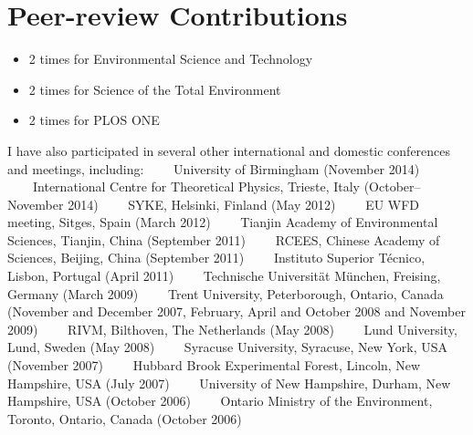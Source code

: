 
\section*{Peer-review Contributions}

\begin{footnotesize}

\begin{itemize}
  \itemsep-0.1em
\item 2 times for Environmental Science and Technology 
\item 2 times for Science of the Total Environment 
\item 2 times for PLOS ONE 
\end{itemize}


\flushleft I have also participated in several other international and domestic
conferences and meetings, including: 
\ \ \textbullet \ \  
University of Birmingham (November 2014)
\ \ \textbullet \ \  
International Centre for Theoretical Physics, Trieste, Italy
(October--November 2014)
\ \ \textbullet \ \  
SYKE, Helsinki, Finland (May 2012)
\ \ \textbullet \ \  
EU WFD meeting, Sitges, Spain (March 2012)
\ \ \textbullet \ \   
Tianjin Academy of Environmental Sciences, Tianjin, China (September 2011)
\ \ \textbullet \ \   
RCEES, Chinese Academy of Sciences, Beijing, China (September 2011)
\ \ \textbullet \ \   
Instituto Superior Técnico, Lisbon, Portugal (April 2011)
\ \ \textbullet \ \   
Technische Universität München, Freising, Germany (March 2009) 
\ \ \textbullet \ \   
Trent University, Peterborough, Ontario, Canada (November and December
2007, February, April and October 2008 and November 2009)
\ \ \textbullet \ \   
RIVM, Bilthoven, The Netherlands (May 2008)
\ \ \textbullet \ \   
Lund University, Lund, Sweden (May 2008)
\ \ \textbullet \ \   
Syracuse University, Syracuse, New York, USA (November 2007)
\ \ \textbullet \ \   
Hubbard Brook Experimental Forest, Lincoln, New Hampshire, USA (July 2007)
\ \ \textbullet \ \   
University of New Hampshire, Durham, New Hampshire, USA (October
2006) 
\ \ \textbullet \ \   
Ontario Ministry of the Environment, Toronto, Ontario, Canada (October 2006)



\end{footnotesize}
